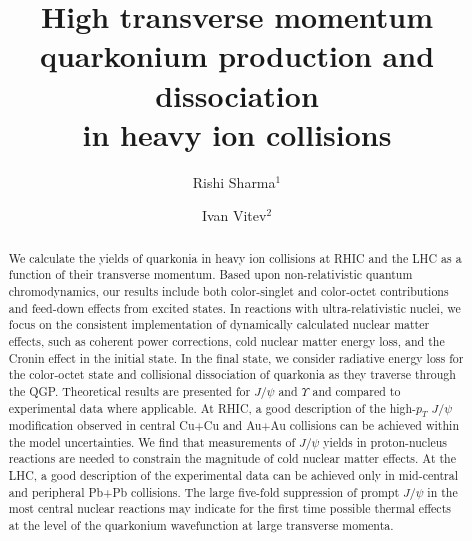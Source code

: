 \documentclass[article,showpacs,preprintnumbers,amsmath,amssymb]{revtex4}
\begin{document}
\begin{flushright}
\vskip .5cm
\end{flushright} \vspace{1cm}


\title{High transverse momentum quarkonium production and dissociation \\ in heavy ion
collisions}

\author{Rishi Sharma$^1$}%

\author{Ivan Vitev$^2$}


\vspace*{1cm}

\begin{abstract}
We calculate the yields of quarkonia in heavy ion collisions at RHIC and the
LHC as a function of their transverse momentum.  Based upon non-relativistic
quantum chromodynamics, our results include both color-singlet and color-octet contributions
and feed-down effects from excited states. In reactions with ultra-relativistic
nuclei, we focus on the consistent implementation of dynamically calculated
nuclear matter effects, such as coherent power corrections, cold nuclear matter
energy loss, and the Cronin effect in the initial state. In the final state, we
consider  radiative energy loss for the color-octet state and collisional
dissociation of quarkonia  as they traverse through the QGP.
Theoretical results are presented for $J/\psi$  and $\Upsilon$ and compared to
experimental data where applicable. At RHIC, a good description of the
high-$p_T$ $J/\psi$  modification observed in central Cu$+$Cu and Au$+$Au
collisions can be achieved within the model uncertainties. We find that
measurements of $J/\psi$ yields in proton-nucleus reactions are needed to
constrain the magnitude of cold nuclear matter effects.  At the LHC, a  good
description of the experimental data can be achieved only in mid-central and
peripheral Pb+Pb collisions. The large five-fold suppression of prompt $J/\psi$
in the most central nuclear reactions  may indicate for the first time possible
thermal effects at the level of the quarkonium  wavefunction at  large
transverse momenta.     
\end{abstract}

\end{document}
